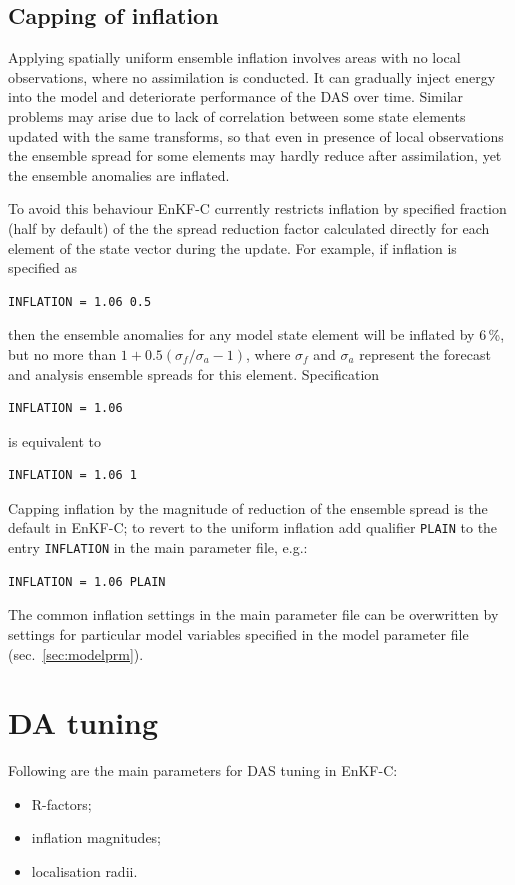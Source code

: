 \documentclass[11pt]{report}
\begin{document}
\subsection{Capping of inflation}
\label{sec:capping}

Applying spatially uniform ensemble inflation involves areas with no local observations, where no assimilation is conducted.
It can gradually inject energy into the model and deteriorate performance of the DAS over time.
Similar problems may arise due to lack of correlation between some state elements updated with the same transforms, so that even in presence of local observations the ensemble spread for some elements may hardly reduce after assimilation, yet the ensemble anomalies are inflated.

To avoid this behaviour EnKF-C currently restricts inflation by specified fraction (half by default) of the the spread reduction factor calculated directly for each element of the state vector during the update.
For example, if inflation is specified as
\begin{Verbatim}
INFLATION = 1.06 0.5
\end{Verbatim}
then the ensemble anomalies for any model state element will be inflated by 6\,\%, but no more than $1 + 0.5 (\sigma_f / \sigma_a - 1)$, where $\sigma_f$ and $\sigma_a$ represent the forecast and analysis ensemble spreads for this element.
Specification
\begin{Verbatim}
INFLATION = 1.06
\end{Verbatim}
is equivalent to
\begin{Verbatim}
INFLATION = 1.06 1
\end{Verbatim}
Capping inflation by the magnitude of reduction of the ensemble spread is the default in EnKF-C; to revert to the uniform inflation add qualifier \verb|PLAIN| to the entry \verb|INFLATION| in the main parameter file, e.g.:
\begin{Verbatim}
INFLATION = 1.06 PLAIN
\end{Verbatim}
The common inflation settings in the main parameter file can be overwritten by settings for particular model variables specified in the model parameter file (sec.~\ref{sec:modelprm}).

\section{DA tuning}
\label{sec:datuning}

Following are the main parameters for DAS tuning in EnKF-C:
\begin{itemize}
\item R-factors;
\item inflation magnitudes;
\item localisation radii.
\end{itemize}
\end{document}
